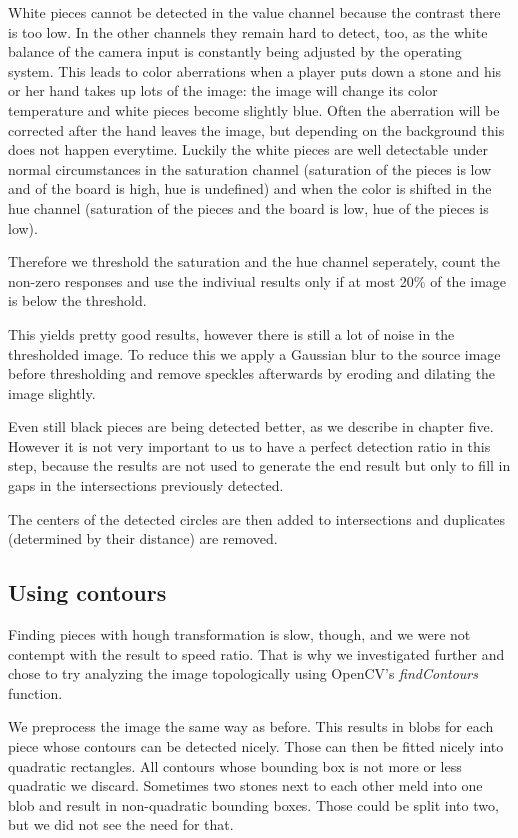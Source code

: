 	White pieces cannot be detected in the value channel because the contrast there is too low. In the other channels they remain hard to detect, too, as the white balance of the camera input is constantly being adjusted by the operating system. This leads to color aberrations when a player puts down a stone and his or her hand takes up lots of the image: the image will change its color temperature and white pieces become slightly blue. Often the aberration will be corrected after the hand leaves the image, but depending on the background this does not happen everytime. Luckily the white pieces are well detectable under normal circumstances in the saturation channel (saturation of the pieces is low and of the board is high, hue is undefined) and when the color is shifted in the hue channel (saturation of the pieces and the board is low, hue of the pieces is low).

	Therefore we threshold the saturation and the hue channel seperately, count the non-zero responses and use the indiviual results only if at most 20\% of the image is below the threshold.

	This yields pretty good results, however there is still a lot of noise in the thresholded image. To reduce this we apply a Gaussian blur to the source image before thresholding and remove speckles afterwards by eroding and dilating the image slightly.

	Even still black pieces are being detected better, as we describe in chapter five. However it is not very important to us to have a perfect detection ratio in this step, because the results are not used to generate the end result but only to fill in gaps in the intersections previously detected.

	The centers of the detected circles are then added to intersections and duplicates (determined by their distance) are removed.

	\subsection{Using contours}
	Finding pieces with hough transformation is slow, though, and we were not contempt with the result to speed ratio. That is why we investigated further and chose to try analyzing the image topologically using OpenCV's \emph{findContours} function.

	We preprocess the image the same way as before. This results in blobs for each piece whose contours can be detected nicely. Those can then be fitted nicely into quadratic rectangles. All contours whose bounding box is not more or less quadratic we discard. Sometimes two stones next to each other meld into one blob and result in non-quadratic bounding boxes. Those could be split into two, but we did not see the need for that.

